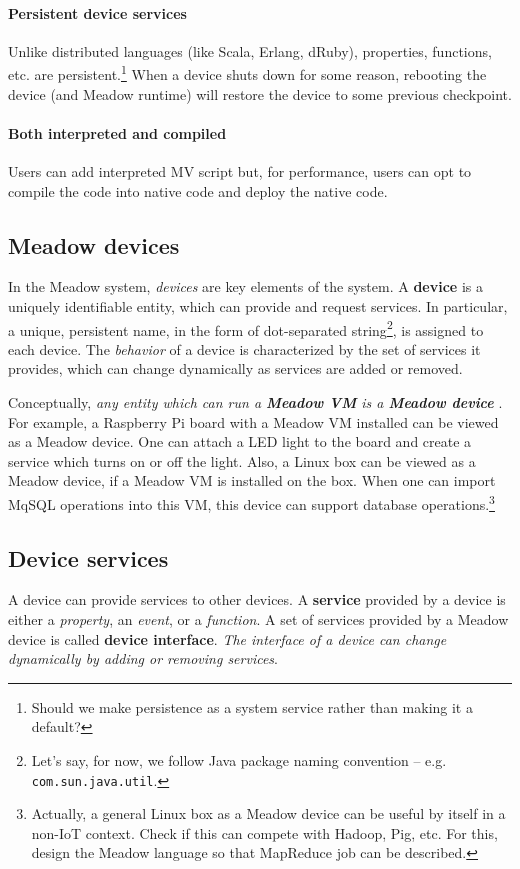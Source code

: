 \documentclass{note}
\begin{document}
\paragraph{Persistent device services}
Unlike distributed languages (like Scala, Erlang, dRuby), properties,
   functions, etc. are persistent.\footnote{\textcolor{green2}{Should we make
       persistence as a system service rather than making it a default?}} 
   When a device shuts down for some reason, rebooting the device (and Meadow
   runtime) will restore the device to some previous checkpoint.

\paragraph{Both interpreted and compiled}
Users can add interpreted MV script
but, for performance, users can opt to compile the code into native code and 
deploy the native code.

\subsection{Meadow devices}
In the Meadow system, {\em devices\/} are key elements of the
system. A \textcolor{blue2}{\bf{}device} is a uniquely identifiable entity,
which can provide and request services. 
In particular, a unique, persistent name, in the form of dot-separated
string\footnote{Let's say, for now, we follow Java package naming convention
  -- e.g. \texttt{com.sun.java.util}.},
is assigned to each device. The {\em behavior\/} of a device is characterized
by the set of services it provides, which can change dynamically as
services are added or removed. 

Conceptually, \textcolor{blue2}{\em any entity which can run a
  \textcolor{blue2}{\bf{}\em Meadow VM} is a {\bf\em Meadow device} \/}. 
For example, a Raspberry Pi board with a Meadow VM installed can be viewed as a
Meadow device. One can attach a LED light to the board and create a service 
which turns on or off the light.
Also, a Linux box can be viewed as a Meadow
device, if a Meadow VM is installed on the box.
When one can import MqSQL operations into this VM, this device can support
database operations.\footnote{\textcolor{green2}{Actually, a general Linux box
    as a Meadow device can be useful by itself in a non-IoT context. 
    Check if this can
    compete with Hadoop, Pig, etc. For this, design the Meadow language so that
    MapReduce job can be described.}}

\subsection{Device services}
A device can provide services to other devices. 
A \textcolor{blue2}{\bf{}service} provided by a device is either a
{\em property}, an {\em event\/}, or a {\em function\/}. 
A set of services provided by a Meadow device is called
\textcolor{blue2}{\bf{}device interface}. 
\textcolor{blue2}{\em The interface of a device can change
dynamically by adding or removing services\/}.
\end{document}
